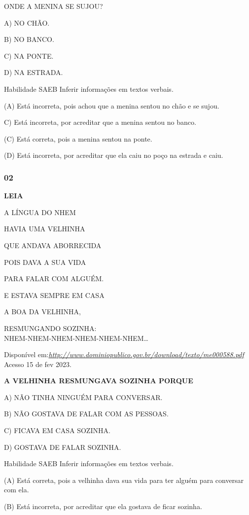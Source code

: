 ONDE A MENINA SE SUJOU?

A) NO CHÃO.

B) NO BANCO.

C) NA PONTE.

D) NA ESTRADA.

\protect\hypertarget{_heading=h.49x2ik5}{}{}Habilidade SAEB Inferir
informações em textos verbais.

(A) Está incorreta, pois achou que a menina sentou no chão e se sujou.

C) Está incorreta, por acreditar que a menina sentou no banco.

(C) Está correta, pois a menina sentou na ponte.

(D) Está incorreta, por acreditar que ela caiu no poço na estrada e
caiu.

\subsubsection{02}\label{section-21}

\textbf{LEIA}

A LÍNGUA DO NHEM

HAVIA UMA VELHINHA

QUE ANDAVA ABORRECIDA

POIS DAVA A SUA VIDA

PARA FALAR COM ALGUÉM.

E ESTAVA SEMPRE EM CASA

A BOA DA VELHINHA,

RESMUNGANDO SOZINHA:\\
NHEM-NHEM-NHEM-NHEM-NHEM-NHEM\ldots{}

Disponível
em:\href{http://www.dominiopublico.gov.br/download/texto/me000588.pdf}{\emph{http://www.dominiopublico.gov.br/download/texto/me000588.pdf}}
Acesso 15 de fev 2023.

\textbf{A VELHINHA RESMUNGAVA SOZINHA PORQUE}

A) NÃO TINHA NINGUÉM PARA CONVERSAR.

B) NÃO GOSTAVA DE FALAR COM AS PESSOAS.

C) FICAVA EM CASA SOZINHA.

D) GOSTAVA DE FALAR SOZINHA.

Habilidade SAEB Inferir informações em textos verbais.

(A) Está correta, pois a velhinha dava sua vida para ter alguém para
conversar com ela.

(B) Está incorreta, por acreditar que ela gostava de ficar sozinha.

